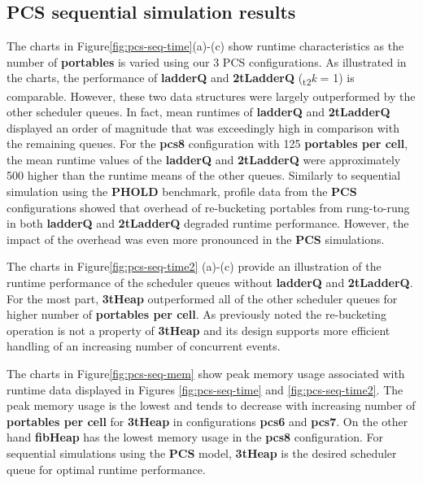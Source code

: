 \subsection{\textbf{PCS} sequential simulation results}\label{sec:pcs_seq}

The charts in Figure\ref{fig:pcs-seq-time}(a)-(c) show runtime characteristics as the number of \textbf{portables} is varied using our 3 PCS configurations. As illustrated in the charts, the performance of \textbf{ladderQ} and \textbf{2tLadderQ} (\textsubscript{t2}\textit{k} = 1) is comparable. However, these two data structures were largely outperformed by the other scheduler queues. In fact, mean runtimes of \textbf{ladderQ} and \textbf{2tLadderQ} displayed an order of magnitude that was exceedingly high in comparison with the remaining queues. For the \textbf{pcs8} configuration with 125 \textbf{portables per cell}, the mean runtime values of the \textbf{ladderQ} and \textbf{2tLadderQ} were approximately 500\texttimes\/ higher than the runtime means of the other queues. Similarly to sequential simulation using the \textbf{PHOLD} benchmark, profile data from the \textbf{PCS} configurations showed that overhead of re-bucketing portables from rung-to-rung in both \textbf{ladderQ} and \textbf{2tLadderQ} degraded runtime performance. However, the impact of the overhead was even more pronounced in the \textbf{PCS} simulations.

The charts in Figure\ref{fig:pcs-seq-time2} (a)-(c) provide an illustration of the runtime performance of the scheduler queues without \textbf{ladderQ} and \textbf{2tLadderQ}. For the most part, \textbf{3tHeap} outperformed all of the other scheduler queues for higher number of \textbf{portables per cell}. As previously noted the re-bucketing operation is not a property of \textbf{3tHeap} and its design supports more efficient handling of an increasing number of concurrent events. 

The charts in Figure\ref{fig:pcs-seq-mem} show peak memory usage associated with runtime data displayed in Figures \ref{fig:pcs-seq-time} and \ref{fig:pcs-seq-time2}. The peak memory usage  is the lowest and tends to decrease with increasing number of \textbf{portables per cell} for \textbf{3tHeap} in configurations \textbf{pcs6} and \textbf{pcs7}. On the other hand \textbf{fibHeap} has the lowest memory usage in the \textbf{pcs8} configuration. For sequential simulations using the \textbf{PCS} model, \textbf{3tHeap} is the desired scheduler queue for optimal runtime performance.

